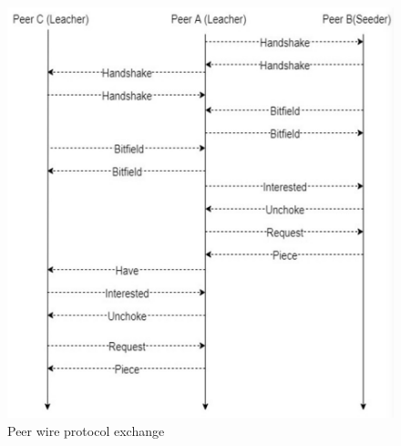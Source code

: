 \documentclass[10pt,a4paper]{report}
\begin{document}
	\begin{figure}[h!]
		\centering
	\includegraphics[scale=0.60]{images/Pasted image 20230311105716.png}
	\caption{Peer wire protocol exchange}
	\label{wire-proto}
\end{figure}
\end{document}
